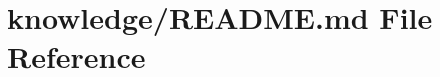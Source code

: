 \hypertarget{knowledge_2_r_e_a_d_m_e_8md}{}\section{knowledge/\+R\+E\+A\+D\+ME.md File Reference}
\label{knowledge_2_r_e_a_d_m_e_8md}
